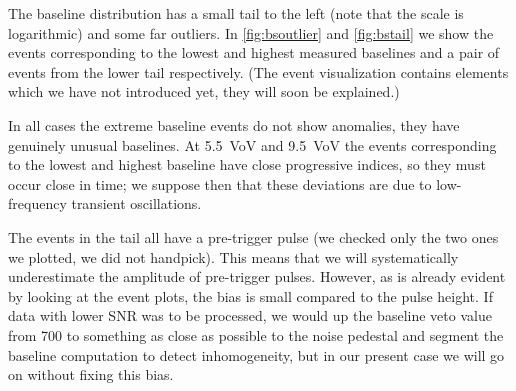 \begin{figure}
    
    
    
\end{figure}

The baseline distribution has a small tail to the left (note that the scale is
logarithmic) and some far outliers. In \autoref{fig:bsoutlier} and
\autoref{fig:bstail} we show the events corresponding to the lowest and highest
measured baselines and a pair of events from the lower tail respectively. (The
event visualization contains elements which we have not introduced yet, they
will soon be explained.)

\begin{figure}
    


\end{figure}

\begin{figure}
    


\end{figure}

In all cases the extreme baseline events do not show anomalies, they have
genuinely unusual baselines. At \SI{5.5}{VoV} and \SI{9.5}{VoV} the events
corresponding to the lowest and highest baseline have close progressive
indices, so they must occur close in time; we suppose then that these
deviations are due to low-frequency transient oscillations.

The events in the tail all have a pre-trigger pulse (we checked only the two
ones we plotted, we did not handpick). This means that we will systematically
underestimate the amplitude of pre-trigger pulses. However, as is already
evident by looking at the event plots, the bias is small compared to the pulse
height. If data with lower SNR was to be processed, we would up the baseline
veto value from 700 to something as close as possible to the noise pedestal and
segment the baseline computation to detect inhomogeneity, but in our present
case we will go on without fixing this bias.

